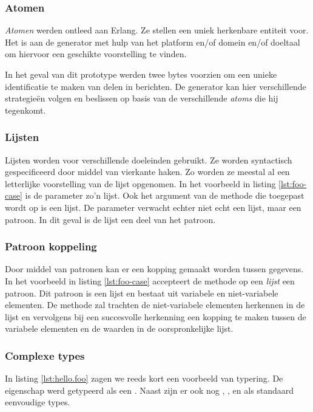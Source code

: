 \subsubsection{Atomen}

\emph{Atomen} werden ontleed aan Erlang. Ze stellen een uniek herkenbare
entiteit voor. Het is aan de generator met hulp van het platform en/of domein
en/of doeltaal om hiervoor een geschikte voorstelling te vinden.

In het geval van dit prototype werden twee bytes voorzien om een unieke
identificatie te maken van delen in berichten. De generator kan hier
verschillende strategie\"en volgen en beslissen op basis van de verschillende
\emph{atoms} die hij tegenkomt.

\subsubsection{Lijsten}

Lijsten worden voor verschillende doeleinden gebruikt. Ze worden syntactisch
gespecificeerd door middel van vierkante haken. Zo worden ze meestal al een
letterlijke voorstelling van de lijst opgenomen. In het voorbeeld in listing
\ref{lst:foo-case} is de  parameter zo'n lijst. Ook het argument
van de  methode die toegepast wordt op  is een
lijst. De parameter verwacht echter niet echt een lijst, maar een patroon. In
dit geval is de lijst een deel van het patroon.

\subsubsection{Patroon koppeling}

Door middel van patronen kan er een kopping gemaakt worden tussen gegevens. In
het voorbeeld in listing \ref{lst:foo-case} accepteert de 
methode op een \emph{lijst} een patroon. Dit patroon is een lijst en bestaat
uit variabele en niet-variabele elementen. De  methode zal
trachten de niet-variabele elementen herkennen in de lijst en vervolgens bij
een succesvolle herkenning een kopping te maken tussen de variabele elementen
en de waarden in de oorspronkelijke lijst.

\subsubsection{Complexe types}

In listing \ref{lst:hello.foo} zagen we reeds kort een voorbeeld van typering.
De  eigenschap werd getypeerd als een . Naast
 zijn er ook nog , ,  en
 als standaard eenvoudige types.

